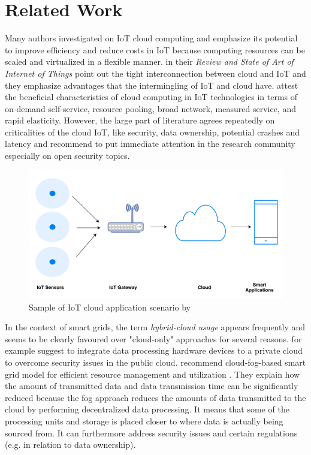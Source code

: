 \section{Related Work}

Many authors investigated on IoT cloud computing and emphasize its potential to improve efficiency and reduce costs in IoT because computing resources can be scaled and virtualized in a flexible manner. \citeauthor{laghari2021review} in their \textit{Review and State of Art of Internet of Things} point out the tight interconnection between cloud and IoT and they emphasize advantages that the intermingling of IoT and cloud have. \citeauthor{almolhis2020security} attest the beneficial characteristics of cloud computing in IoT technologies in terms of on-demand self-service, resource pooling, broad network, measured service, and rapid elasticity. However, the large part of literature agrees repeatedly on criticalities of the cloud IoT, like security, data ownership, potential crashes and latency and \citeauthor{almolhis2020security} recommend to put immediate attention in the research community especially on open security topics.

\begin{figure}[htbp]
\centerline{\includegraphics[scale=0.35]{images/iot_cloud_application_scenario.png}}
\caption{Sample of IoT cloud application scenario by \citeauthor{almolhis2020security}}
\label{fig}
\end{figure}

In the context of smart grids, the term \textit{hybrid-cloud usage} appears frequently and seems to be clearly favoured over "cloud-only" approaches for several reasons. \citeauthor{talaat2020hybrid} for example suggest to integrate data processing hardware devices to a private cloud to overcome security issues in the public cloud. \citeauthor{zahoor2018cloudmanag} recommend cloud-fog-based smart grid model for efficient resource management \cite{zahoor2018cloudmanag} and utilization \cite{zahoor2018cloudutil}. They explain how the amount of transmitted data and data transmission time can be significantly reduced because the fog approach reduces the amounts of data transmitted to the cloud by performing decentralized data processing. It means that some of the processing units and storage is placed closer to where data is actually being sourced from. It can furthermore address security issues and certain regulations (e.g. in relation to data ownership).

